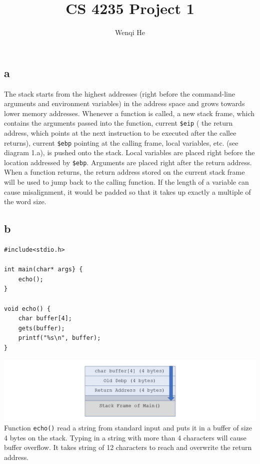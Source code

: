 \documentclass{article}
\author{Wenqi He}
\title{CS 4235 Project 1}
\begin{document}
\maketitle
\section{}
\subsection*{a}
The stack starts from the highest addresses (right before the command-line arguments and environment variables) in the address space and grows towards lower memory addresses. Whenever a function is called, a new stack frame, which contains the arguments passed into the function, current \texttt{\$eip} ( the return address, which points at the next instruction to be executed after the callee returns), current \texttt{\$ebp} pointing at the calling frame,  local variables, etc. (see diagram 1.a), is pushed onto the stack. Local variables are placed right before the location addressed by \texttt{\$ebp}. Arguments are placed right after the return address. When a function returns, the return address stored on the current stack frame will be used to jump back to the calling function. If the length of a variable can cause misalignment, it would be padded so that it takes up exactly a multiple of the word size.
\subsection*{b}
\begin{verbatim}
#include<stdio.h>

int main(char* args} {
    echo();
}

void echo() {
    char buffer[4];
    gets(buffer);
    printf("%s\n", buffer);
}
\end{verbatim}
\includegraphics[width=\textwidth]{1b.jpg}\\
Function \texttt{echo()} read a string from standard input and puts it in a buffer of size 4 bytes on the stack. Typing in a string with more than 4 characters will cause buffer overflow. It takes string of 12 characters to reach and overwrite the return address.
\end{document}
